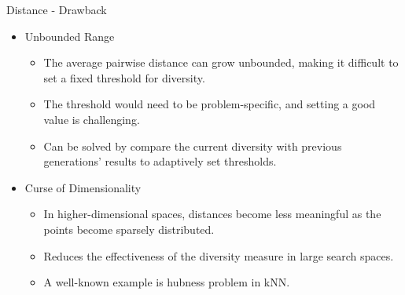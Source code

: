     \begin{frame}{Distance - Drawback}
        \begin{itemize}
            \item Unbounded Range
                \begin{itemize}
                    \item The average pairwise distance can grow unbounded, making it difficult to set a fixed threshold for diversity.
                    \item The threshold would need to be problem-specific, and setting a good value is challenging.
                    \item Can be solved by compare the current diversity with previous generations' results to adaptively set thresholds.
                \end{itemize}
            \item Curse of Dimensionality
                \begin{itemize}
                    \item In higher-dimensional spaces, distances become less meaningful as the points become sparsely distributed.
                    \item Reduces the effectiveness of the diversity measure in large search spaces.
                    \item A well-known example is hubness problem in kNN. \cite{hubness}
                \end{itemize}
        \end{itemize}
    \end{frame}

